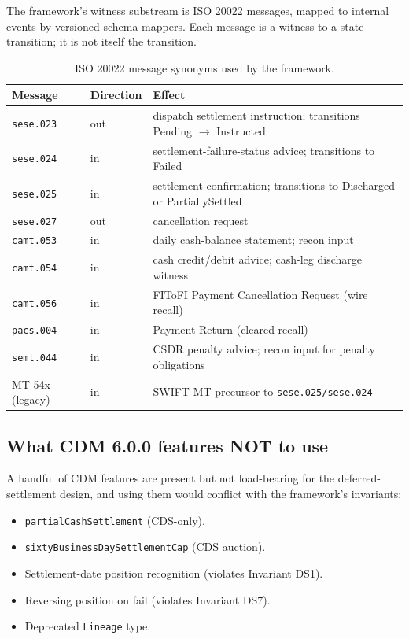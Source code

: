 \documentclass[11pt,a4paper]{article}
\begin{document}
The framework's witness substream is ISO 20022 messages, mapped to internal events by versioned schema mappers. Each message is a witness to a state transition; it is not itself the transition.

\begin{table}[h]
\centering
\begin{tabular}{lll}
\toprule
\textbf{Message} & \textbf{Direction} & \textbf{Effect} \\
\midrule
\texttt{sese.023}    & out & dispatch settlement instruction; transitions Pending $\to$ Instructed \\
\texttt{sese.024}    & in  & settlement-failure-status advice; transitions to Failed \\
\texttt{sese.025}    & in  & settlement confirmation; transitions to Discharged or PartiallySettled \\
\texttt{sese.027}    & out & cancellation request \\
\texttt{camt.053}    & in  & daily cash-balance statement; recon input \\
\texttt{camt.054}    & in  & cash credit/debit advice; cash-leg discharge witness \\
\texttt{camt.056}    & in  & FIToFI Payment Cancellation Request (wire recall) \\
\texttt{pacs.004}    & in  & Payment Return (cleared recall) \\
\texttt{semt.044}    & in  & CSDR penalty advice; recon input for penalty obligations \\
MT 54x (legacy)      & in  & SWIFT MT precursor to \texttt{sese.025/sese.024} \\
\bottomrule
\end{tabular}
\caption{ISO 20022 message synonyms used by the framework.}
\end{table}

\subsection{What CDM 6.0.0 features NOT to use}

A handful of CDM features are present but not load-bearing for the deferred-settlement design, and using them would conflict with the framework's invariants:
\begin{itemize}[nosep]
\item \texttt{partialCashSettlement} (CDS-only).
\item \texttt{sixtyBusinessDaySettlementCap} (CDS auction).
\item Settlement-date position recognition (violates Invariant DS1).
\item Reversing position on fail (violates Invariant DS7).
\item Deprecated \texttt{Lineage} type.
\end{itemize}
\end{document}
